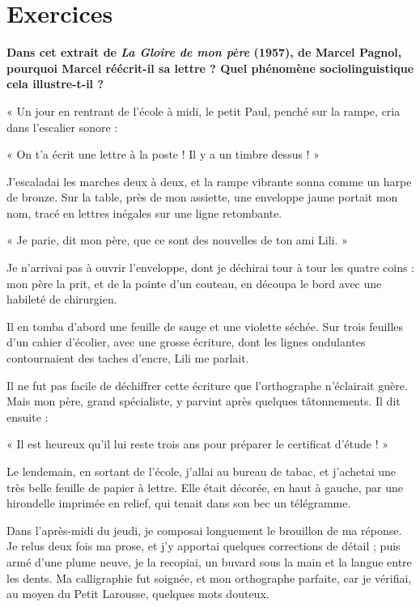 \section*{Exercices}
\begin{keybox}[I]
\textbf{Dans cet extrait de \textit{La Gloire de mon père} (1957), de Marcel Pagnol, pourquoi Marcel réécrit-il sa lettre ? Quel phénomène sociolinguistique cela illustre-t-il ?}

« Un jour en rentrant de l’école à midi, le petit Paul, penché sur la rampe, cria dans l’escalier sonore :

« On t’a écrit une lettre à la poste ! Il y a un timbre dessus ! »

J’escaladai les marches deux à deux, et la rampe vibrante sonna comme un harpe de bronze. Sur la table, près de mon assiette, une enveloppe jaune portait mon nom, tracé en lettres inégales sur une ligne retombante.

« Je parie, dit mon père, que ce sont des nouvelles de ton ami Lili. »

Je n’arrivai pas à ouvrir l’enveloppe, dont je déchirai tour à tour les quatre coins : mon père la prit, et de la pointe d’un couteau, en découpa le bord avec une habileté de chirurgien.

Il en tomba d’abord une feuille de sauge et une violette séchée. Sur trois feuilles d’un cahier d’écolier, avec une grosse écriture, dont les lignes ondulantes contournaient des taches d’encre, Lili me parlait.

Il ne fut pas facile de déchiffrer cette écriture que l’orthographe n’éclairait guère. Mais mon père, grand spécialiste, y parvint après quelques tâtonnements. Il dit ensuite :

« Il est heureux qu’il lui reste trois ans pour préparer le certificat d’étude ! »

Le lendemain, en sortant de l’école, j’allai au bureau de tabac, et j’achetai une très belle feuille de papier à lettre. Elle était décorée, en haut à gauche, par une hirondelle imprimée en relief, qui tenait dans son bec un télégramme.

Dans l’après-midi du jeudi, je composai longuement le brouillon de ma réponse. Je relus deux fois ma prose, et j’y apportai quelques corrections de détail ; puis armé d’une plume neuve, je la recopiai, un buvard sous la main et la langue entre les dents. Ma calligraphie fut soignée, et mon orthographe parfaite, car je vérifiai, au moyen du Petit Larousse, quelques mots douteux.


\end{keybox}
